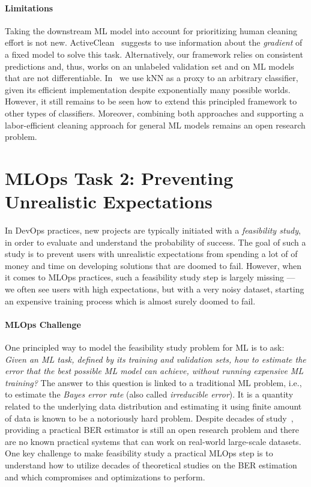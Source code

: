 \documentclass[11pt]{article}
\begin{document}
\paragraph{Limitations}
Taking the downstream ML model into account for prioritizing human cleaning effort is not new. ActiveClean~\cite{krishnan2016activeclean} suggests to use information about the \textit{gradient} of a fixed model to solve this task. Alternatively, our framework relies on consistent predictions and, thus, works on an unlabeled validation set
and on ML models that are not differentiable. 
In~\cite{karlavs2020nearest}
we use kNN as a proxy to an arbitrary classifier, given its efficient implementation despite exponentially many possible worlds. However, it still remains to be seen
how to extend this principled framework 
to other types of classifiers. Moreover, combining both approaches and supporting a labor-efficient cleaning approach for general ML models remains an open research problem.

\section{MLOps Task 2: Preventing Unrealistic Expectations}
\label{sec:snoopy}

In DevOps practices, new projects are typically initiated with a \textit{feasibility study}, in order to evaluate and understand the probability of success. The goal of such a study is to prevent users with unrealistic expectations from spending a lot of of money and time on developing solutions that are doomed to fail. However, when it
comes to MLOps practices, such a 
feasibility study step is largely missing --- we often
see users with high expectations, but with a very noisy dataset, starting an
expensive training process which is almost surely
doomed to fail.


\paragraph*{MLOps Challenge}
One principled way to model the feasibility
study problem for ML is to ask:
\textit{Given an ML task, defined by its training and validation sets, how to estimate the 
error that the best
possible ML model can achieve, without
running expensive ML training?}
The answer to this question 
is linked to a traditional ML problem, i.e.,
to estimate the \emph{Bayes error rate} (also called \emph{irreducible error}). It is a quantity related to the underlying data distribution and estimating it using finite amount of data is known to be a notoriously hard problem. Despite decades of study~\cite{cover1967nearest, fukunaga1987bayes, sekeh2018multi},
providing a practical BER estimator is still 
an open research problem and there are no known practical 
systems that can work on real-world large-scale datasets. One key challenge to make feasibility
study a practical MLOps step is to understand 
how to utilize decades of theoretical studies
on the BER estimation and which  
compromises and optimizations to perform.
\end{document}
